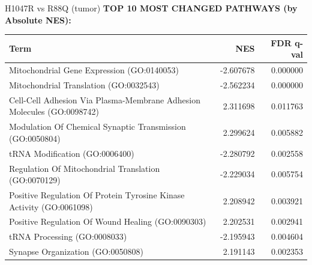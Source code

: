 \documentclass[10pt, aspectratio=169]{beamer}
\begin{document}
\begin{frame}{H1047R vs R88Q (tumor)}
  \centering
  {\small \textbf{TOP 10 MOST CHANGED PATHWAYS (by Absolute NES):}}\par
  \vspace{0.15cm}
  \scriptsize
  \begin{tabular}{p{8cm} r r}
    \toprule
    \textbf{Term} & \textbf{NES} & \textbf{FDR q-val} \\
    \midrule
    Mitochondrial Gene Expression (GO:0140053) & -2.607678 & 0.000000 \\
    Mitochondrial Translation (GO:0032543) & -2.562234 & 0.000000 \\
    Cell-Cell Adhesion Via Plasma-Membrane Adhesion Molecules (GO:0098742) & 2.311698 & 0.011763 \\
    Modulation Of Chemical Synaptic Transmission (GO:0050804) & 2.299624 & 0.005882 \\
    tRNA Modification (GO:0006400) & -2.280792 & 0.002558 \\
    Regulation Of Mitochondrial Translation (GO:0070129) & -2.229034 & 0.005754 \\
    Positive Regulation Of Protein Tyrosine Kinase Activity (GO:0061098) & 2.208942 & 0.003921 \\
    Positive Regulation Of Wound Healing (GO:0090303) & 2.202531 & 0.002941 \\
    tRNA Processing (GO:0008033) & -2.195943 & 0.004604 \\
    Synapse Organization (GO:0050808) & 2.191143 & 0.002353 \\
    \bottomrule
  \end{tabular}
\end{frame}
\end{document}
